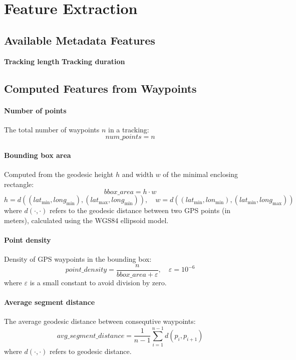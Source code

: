 \documentclass[a4paper,12pt,twoside]{scrreprt}
\begin{document}
\section{Feature Extraction}

\subsection{Available Metadata Features}

\textbf{Tracking length}
\textbf{Tracking duration}

\subsection{Computed Features from Waypoints}

\paragraph{Number of points}

The total number of waypoints $n$ in a tracking:
\[
  num\_points = n
\]

\paragraph{Bounding box area}

Computed from the geodesic height $h$ and width $w$ of the minimal enclosing
rectangle:
\[
  bbox\_area = h \cdot w
\]
\[
  h = d((lat_{\min}, long_{\min}), (lat_{\max}, long_{\min})), \quad w =
  d((lat_{\min}, lon_{\min}), (lat_{\min}, long_{\max}))
\]
where $d(\cdot, \cdot)$ refers to the geodesic distance between two GPS points
(in
meters), calculated using the WGS84 ellipsoid model.

\paragraph{Point density}

Density of GPS waypoints in the bounding box:
\[
  point\_density = \frac{n}{bbox\_area + \varepsilon}, \quad
  \varepsilon = 10^{-6}
\]
where $\varepsilon$ is a small constant to avoid division by zero.

\paragraph{Average segment distance}

The average geodesic distance between consequtive waypoints:
\[
  avg\_segment\_distance = \frac{1}{n-1} \sum_{i=1}^{n-1} d(p_i, p_{i+1})
\]
where $d(\cdot, \cdot)$ refers to geodesic distance.
\end{document}
